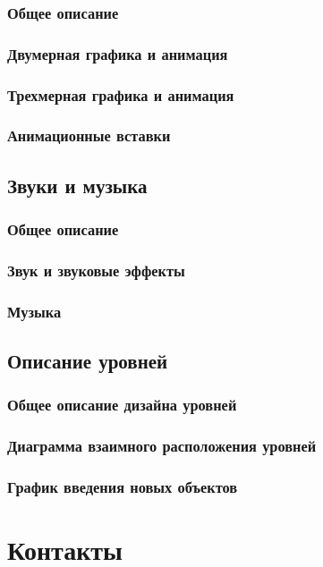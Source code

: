 \documentclass{article}
\begin{document}
	\subsubsection{Общее описание}
	
	\subsubsection{Двумерная графика и анимация}
	
	\subsubsection{Трехмерная графика и анимация}
	
	\subsubsection{Анимационные вставки}
	
	\subsection{Звуки и музыка}
	
	\subsubsection{Общее описание}
	
	\subsubsection{Звук и звуковые эффекты}
	
	\subsubsection{Музыка}
	
	\subsection{Описание уровней}
	
	\subsubsection{Общее описание дизайна уровней}
	
	\subsubsection{Диаграмма взаимного расположения уровней}
	
	\subsubsection{График введения новых объектов}
	
	\section{Контакты}
	
	\newpage
	
\end{document}
